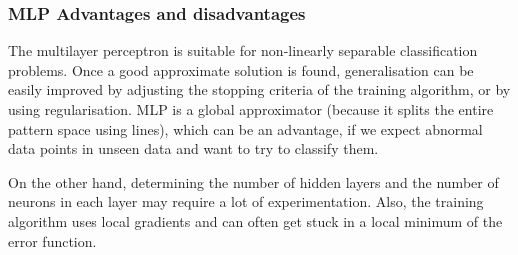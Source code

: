 \documentclass[a4paper, 11pt]{article}
\begin{document}
\subsubsection{MLP Advantages and disadvantages}
The multilayer perceptron is suitable for non-linearly separable classification problems. Once a good approximate solution is found, generalisation can be easily improved by adjusting the stopping criteria of the training algorithm, or by using regularisation. MLP is a global approximator (because it splits the entire pattern space using lines), which can be an advantage, if we expect abnormal data points in unseen data and want to try to classify them. 

On the other hand, determining the number of hidden layers and the number of neurons in each layer may require a lot of experimentation. Also, the training algorithm uses local gradients and can often get stuck in a local minimum of the error function. 


\end{document}
